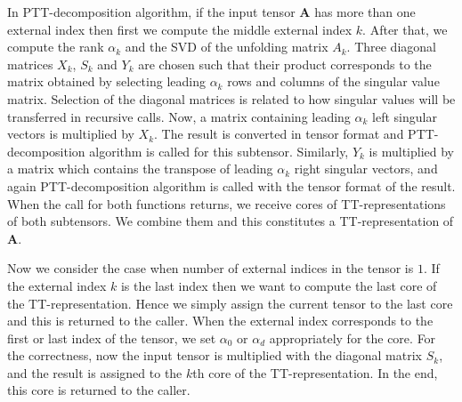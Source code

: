 \documentclass[runningheads]{llncs}
\newcommand{\tensor}[1]{{\cal\textbf{#1}\xspace}}
\begin{document}
In PTT-decomposition algorithm, if the input tensor \tensor{A} has more than one external index then first we compute the middle external index $k$. After that, we compute the rank $\alpha_k$ and the SVD of the unfolding matrix $A_k$. Three diagonal matrices $X_k$, $S_k$ and $Y_k$ are chosen such that their product corresponds to the matrix obtained by selecting leading $\alpha_k$ rows and columns of the singular value matrix. Selection of the diagonal matrices is related to how singular values will be transferred in recursive calls. Now, a matrix containing leading $\alpha_k$ left singular vectors is multiplied by $X_k$. The result is converted in tensor format and PTT-decomposition algorithm is called for this subtensor. Similarly, $Y_k$ is multiplied by a matrix which contains the transpose of leading $\alpha_k$ right singular vectors, and again PTT-decomposition algorithm is called with the tensor format of the result. When the call for both functions returns, we receive cores of TT-representations of both subtensors. We combine them and this constitutes a TT-representation of \tensor{A}.

Now we consider the case when number of external indices in the tensor is $1$. If the external index $k$ is the last index then we want to compute the last core of the TT-representation. Hence we simply assign the current tensor to the last core and this is returned to the caller. When the external index corresponds to the first or last index of the tensor, we set $\alpha_0$ or $\alpha_d$ appropriately for the core. For the correctness, now the input tensor is multiplied with the diagonal matrix $S_k$, and the result is assigned to the $k$th core of the TT-representation. In the end, this core is returned to the caller. 
\end{document}
